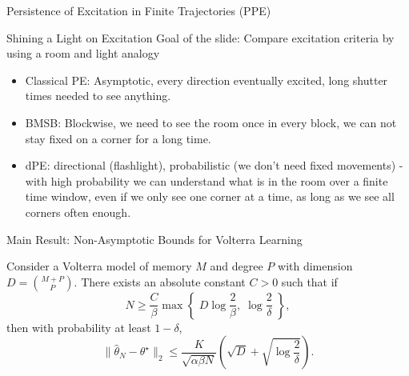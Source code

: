 \documentclass[aspectratio=169, notheorems, 10pt]{beamer}
\begin{document}
{\begin{frame}[plain]{Persistence of Excitation in Finite Trajectories (PPE)}
\begin{figure}[htbp, center]
\end{figure}    
    \vspace{3em}

    \note{
    }
\end{frame}

\begin{frame}{Shining a Light on Excitation}
    Goal of the slide:
    Compare excitation criteria by using a room and light analogy
    \begin{itemize}
        \item Classical PE: Asymptotic, every direction eventually excited, long shutter times needed to see anything.
        \item BMSB: Blockwise, we need to see the room once in every block, we can not stay fixed on a corner for a long time.
        \item dPE: directional (flashlight), probabilistic (we don't need fixed movements) - with high probability we can understand what is in the room over a finite time window, even if we only see one corner at a time, as long as we see all corners often enough.
    \end{itemize}
\end{frame}
}

\begin{frame}{Main Result: Non-Asymptotic Bounds for Volterra Learning}
\begin{theorem}
\label{thm:volterra_sample_complexity}
Consider a Volterra model of memory $M$ and degree $P$ with dimension $D = \binom{M+P}{P}$. 
There exists an absolute constant $C>0$ such that if
\begin{equation}
N \geq \frac{C}{\beta}\max\left\{\; D\log\frac{2}{\beta},\;\log\frac{2}{\delta}\;\right\},
\end{equation}
then with probability at least $1 -\delta$,
\begin{equation}
\|\hat{\theta}_N - \theta^\star\|_2 \leq \frac{K}{\sqrt{\alpha \beta N}} \left(\sqrt{D} + \sqrt{\log \frac{2}{\delta}}\right).
\end{equation}
\end{theorem}
\end{frame}
\end{document}
